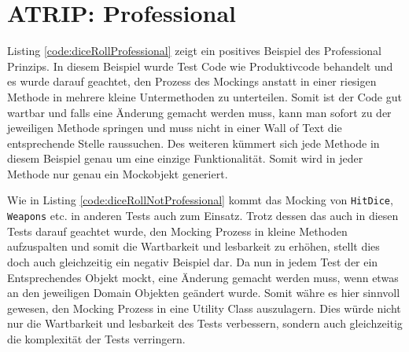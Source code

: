 \section{ATRIP: Professional}

Listing \ref{code:diceRollProfessional} zeigt ein positives Beispiel des Professional Prinzips. In diesem Beispiel wurde Test Code wie Produktivcode behandelt und es wurde darauf geachtet, den Prozess des Mockings anstatt in einer riesigen Methode in mehrere kleine Untermethoden zu unterteilen. Somit ist der Code gut wartbar und falls eine Änderung gemacht werden muss, kann man sofort zu der jeweiligen Methode springen und muss nicht in einer Wall of Text die entsprechende Stelle raussuchen. Des weiteren kümmert sich jede Methode in diesem Beispiel genau um eine einzige Funktionalität. Somit wird in jeder Methode nur genau ein Mockobjekt generiert.

Wie in Listing \ref{code:diceRollNotProfessional} kommt das Mocking von \texttt{HitDice}, \texttt{Weapons} etc. in anderen Tests auch zum Einsatz. Trotz dessen das auch in diesen Tests darauf geachtet wurde, den Mocking Prozess in kleine Methoden aufzuspalten und somit die Wartbarkeit und lesbarkeit zu erhöhen, stellt dies doch auch gleichzeitig ein negativ Beispiel dar. Da nun in jedem Test der ein Entsprechendes Objekt mockt, eine Änderung gemacht werden muss, wenn etwas an den jeweiligen Domain Objekten geändert wurde. Somit währe es hier sinnvoll gewesen, den Mocking Prozess in eine Utility Class auszulagern. Dies würde nicht nur die Wartbarkeit und lesbarkeit des Tests verbessern, sondern auch gleichzeitig die komplexität der Tests verringern.

